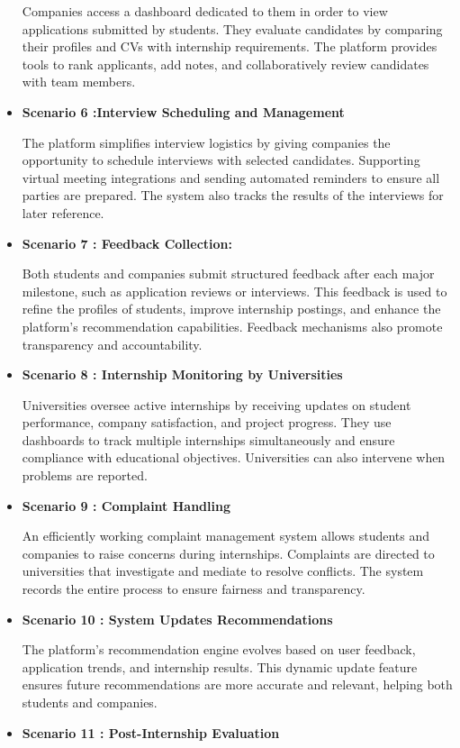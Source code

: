 \begin{itemize}
Companies access a dashboard dedicated to them in order to view applications submitted by students. They evaluate candidates by comparing their profiles and CVs with internship requirements. The platform provides tools to rank applicants, add notes, and collaboratively review candidates with team members.
\item \textbf{Scenario 6 :\textbf{Interview Scheduling and Management}}

The platform simplifies interview logistics by giving companies the opportunity to schedule interviews with selected candidates. Supporting virtual meeting integrations and sending automated reminders to ensure all parties are prepared. The system also tracks the results of the interviews for later reference.
\item \textbf{Scenario 7 : Feedback Collection:} 

Both students and companies submit structured feedback after each major milestone, such as application reviews or interviews. This feedback is used to refine the profiles of students, improve internship postings, and enhance the platform’s recommendation capabilities. Feedback mechanisms also promote transparency and accountability.
\item \textbf{Scenario 8 : \textbf{Internship Monitoring by Universities} }

Universities oversee active internships by receiving updates on student performance, company satisfaction, and project progress. They use dashboards to track multiple internships simultaneously and ensure compliance with educational objectives. Universities can also intervene when problems are reported.
\item \textbf{Scenario 9 : \textbf{Complaint Handling}}

An efficiently working complaint management system allows students and companies to raise concerns during internships. Complaints are directed to universities that investigate and mediate to resolve conflicts. The system records the entire process to ensure fairness and transparency.
\item \textbf{Scenario 10 : \textbf{System Updates Recommendations} }

The platform’s recommendation engine evolves based on user feedback, application trends, and internship results. This dynamic update feature ensures future recommendations are more accurate and relevant, helping both students and companies.
\item \textbf{Scenario 11 : \textbf{Post-Internship Evaluation} }


\end{itemize}

